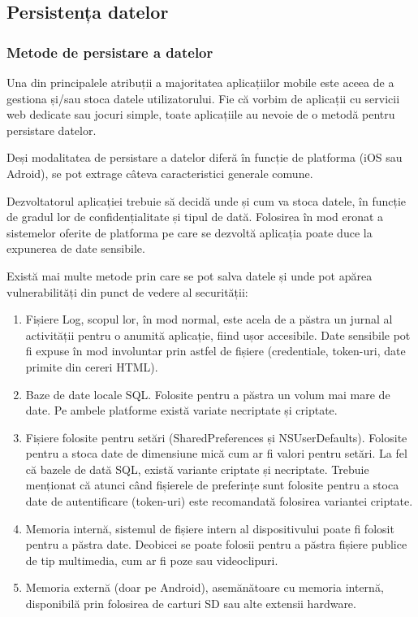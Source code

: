 \documentclass[12pt]{article}
\begin{document}
\newpage
\subsection{Persistența datelor}
\subsubsection{Metode de persistare a datelor}

Una din principalele atribuții a majoritatea aplicațiilor mobile
este aceea de a gestiona și/sau stoca datele utilizatorului. Fie că 
vorbim de aplicații cu servicii web dedicate sau jocuri simple, toate aplicațiile
au nevoie de o metodă pentru persistare datelor. 

Deși modalitatea de persistare a datelor diferă în funcție de platforma
(iOS sau Adroid), se pot extrage câteva caracteristici generale comune.

Dezvoltatorul aplicației trebuie să decidă unde și cum va stoca datele,
în funcție de gradul lor de confidențialitate și tipul de dată. Folosirea
în mod eronat a sistemelor oferite de platforma pe care se dezvoltă aplicația
poate duce la expunerea de date sensibile.

Există mai multe metode prin care se pot salva datele și unde pot apărea
vulnerabilități din punct de vedere al securității:

\begin{enumerate}
    \item Fișiere Log, scopul lor, în mod normal, este acela de a păstra
    un jurnal al activității pentru o anumită aplicație, fiind ușor
    accesibile. Date sensibile pot fi expuse în mod involuntar prin astfel de fișiere (credentiale, token-uri, 
    date primite din cereri HTML).
    \item Baze de date locale SQL. Folosite pentru a păstra
    un volum mai mare de date. Pe ambele platforme există variate necriptate și criptate.
    \item Fișiere folosite pentru setări (SharedPreferences și NSUserDefaults). Folosite
    pentru a stoca date de dimensiune mică cum ar fi valori pentru setări. La fel că 
    bazele de dată SQL, există variante criptate și necriptate. Trebuie menționat
    că atunci când fișierele de preferințe sunt folosite pentru a stoca date de autentificare (token-uri) 
    este recomandată folosirea variantei criptate.
    \item Memoria internă, sistemul de fișiere intern al dispositivului poate fi folosit
    pentru a păstra date. Deobicei se poate folosii pentru a păstra fișiere publice de tip 
    multimedia, cum ar fi poze sau videoclipuri.
    \item Memoria externă (doar pe Android), asemănătoare cu memoria internă, 
    disponibilă prin folosirea de carturi SD sau alte extensii hardware.
\end{enumerate}
\end{document}
